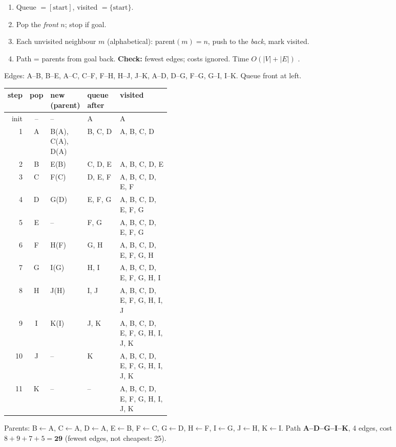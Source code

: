 \begin{multicols}{3}
\label{w12:bfs}
\begin{recipe}[BFS]
\begin{enumerate}
\item Queue $=[\text{start}]$, visited $=\{\text{start}\}$.
\item Pop the \emph{front} $n$; stop if goal.
\item Each unvisited neighbour $m$ (alphabetical): parent$(m)=n$, push to the \emph{back}, mark visited.
\item Path = parents from goal back. \textbf{Check:} fewest edges; costs ignored. Time $O(|V|+|E|)$ .
\end{enumerate}
\end{recipe}
\begin{worked}
Edges: A--B, B--E, A--C, C--F, F--H, H--J, J--K, A--D, D--G, F--G, G--I, I--K. Queue front at left.\par\vspace{1pt}
\scriptsize\setlength{\tabcolsep}{2pt}
\begin{tabularx}{\linewidth}{@{}rc>{\raggedright\arraybackslash}p{0.17\linewidth}>{\raggedright\arraybackslash}p{0.2\linewidth}X@{}}\toprule
step & pop & new (parent) & queue after & visited\\\midrule
init & -- & -- & A & A\\
1 & A & B(A), C(A), D(A) & B, C, D & A, B, C, D\\
2 & B & E(B) & C, D, E & A, B, C, D, E\\
3 & C & F(C) & D, E, F & A, B, C, D, E, F\\
4 & D & G(D) & E, F, G & A, B, C, D, E, F, G\\
5 & E & -- & F, G & A, B, C, D, E, F, G\\
6 & F & H(F) & G, H & A, B, C, D, E, F, G, H\\
7 & G & I(G) & H, I & A, B, C, D, E, F, G, H, I\\
8 & H & J(H) & I, J & A, B, C, D, E, F, G, H, I, J\\
9 & I & K(I) & J, K & A, B, C, D, E, F, G, H, I, J, K\\
10 & J & -- & K & A, B, C, D, E, F, G, H, I, J, K\\
11 & K & -- & -- & A, B, C, D, E, F, G, H, I, J, K\\
\bottomrule\end{tabularx}\par\vspace{1pt}
Parents: B$\leftarrow$A, C$\leftarrow$A, D$\leftarrow$A, E$\leftarrow$B, F$\leftarrow$C, G$\leftarrow$D, H$\leftarrow$F, I$\leftarrow$G, J$\leftarrow$H, K$\leftarrow$I. Path \textbf{A--D--G--I--K}, 4 edges, cost $8+9+7+5=\mathbf{29}$ (fewest edges, not cheapest: 25). \chk

\end{worked}
\end{multicols}
